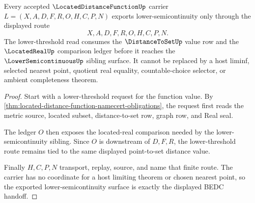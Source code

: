 \begin{theorem}
\label{thm:located-distance-function-lower-semicontinuity}
Every accepted $\LocatedDistanceFunctionUp$ carrier $L=(X,A,D,F,R,O,H,C,P,N)$ exports lower-semicontinuity only through the displayed route
$$
X,A,D,F,R,O,H,C,P,N .
$$
The lower-threshold read consumes the $\DistanceToSetUp$ value row and the $\LocatedRealUp$ comparison ledger before it reaches the $\LowerSemicontinuousUp$ sibling surface. It cannot be replaced by a host liminf, selected nearest point, quotient real equality, countable-choice selector, or ambient completeness theorem.
\end{theorem}
\begin{proof}
Start with a lower-threshold request for the function value. By \autoref{thm:located-distance-function-namecert-obligations}, the request first reads the metric source, located subset, distance-to-set row, graph row, and Real seal.

The ledger $O$ then exposes the located-real comparison needed by the lower-semicontinuity sibling. Since $O$ is downstream of $D,F,R$, the lower-threshold route remains tied to the same displayed point-to-set distance value.

Finally $H,C,P,N$ transport, replay, source, and name that finite route. The carrier has no coordinate for a host limiting theorem or chosen nearest point, so the exported lower-semicontinuity surface is exactly the displayed BEDC handoff.
\end{proof}


\begin{closurestatus}{\LocatedDistanceFunctionUp}
  \theoryclosure{\seedClosure}
  \formalstatus{\unformalizedV}
\end{closurestatus}
